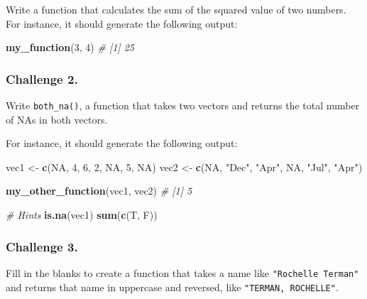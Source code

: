 \documentclass[
]{book}
\newenvironment{Shaded}{\begin{snugshade}}{\end{snugshade}}
\newcommand{\CommentTok}[1]{\textcolor[rgb]{0.56,0.35,0.01}{\textit{#1}}}
\newcommand{\DecValTok}[1]{\textcolor[rgb]{0.00,0.00,0.81}{#1}}
\newcommand{\KeywordTok}[1]{\textcolor[rgb]{0.13,0.29,0.53}{\textbf{#1}}}
\newcommand{\NormalTok}[1]{#1}
\newcommand{\OtherTok}[1]{\textcolor[rgb]{0.56,0.35,0.01}{#1}}
\newcommand{\StringTok}[1]{\textcolor[rgb]{0.31,0.60,0.02}{#1}}
\begin{document}
Write a function that calculates the sum of the squared value of two numbers. For instance, it should generate the following output:

\begin{Shaded}
\begin{Highlighting}[]
\KeywordTok{my_function}\NormalTok{(}\DecValTok{3}\NormalTok{, }\DecValTok{4}\NormalTok{)}
\CommentTok{# [1] 25}
\end{Highlighting}
\end{Shaded}

\hypertarget{challenge-2.-12}{%
\subsubsection*{Challenge 2.}\label{challenge-2.-12}}

Write \texttt{both\_na()}, a function that takes two vectors and returns the total number of NAs in both vectors.

For instance, it should generate the following output:

\begin{Shaded}
\begin{Highlighting}[]
\NormalTok{vec1 <-}\StringTok{ }\KeywordTok{c}\NormalTok{(}\OtherTok{NA}\NormalTok{, }\DecValTok{4}\NormalTok{, }\DecValTok{6}\NormalTok{, }\DecValTok{2}\NormalTok{, }\OtherTok{NA}\NormalTok{, }\DecValTok{5}\NormalTok{, }\OtherTok{NA}\NormalTok{)}
\NormalTok{vec2 <-}\StringTok{ }\KeywordTok{c}\NormalTok{(}\OtherTok{NA}\NormalTok{, }\StringTok{"Dec"}\NormalTok{, }\StringTok{"Apr"}\NormalTok{, }\OtherTok{NA}\NormalTok{, }\StringTok{"Jul"}\NormalTok{, }\StringTok{"Apr"}\NormalTok{)}

\KeywordTok{my_other_function}\NormalTok{(vec1, vec2)}
\CommentTok{# [1] 5}

\CommentTok{# Hints}
\KeywordTok{is.na}\NormalTok{(vec1)}
\KeywordTok{sum}\NormalTok{(}\KeywordTok{c}\NormalTok{(T, F))}
\end{Highlighting}
\end{Shaded}

\hypertarget{challenge-3.-9}{%
\subsubsection*{Challenge 3.}\label{challenge-3.-9}}

Fill in the blanks to create a function that takes a name like \texttt{"Rochelle\ Terman"} and returns that name in uppercase and reversed, like \texttt{"TERMAN,\ ROCHELLE"}.
\end{document}
